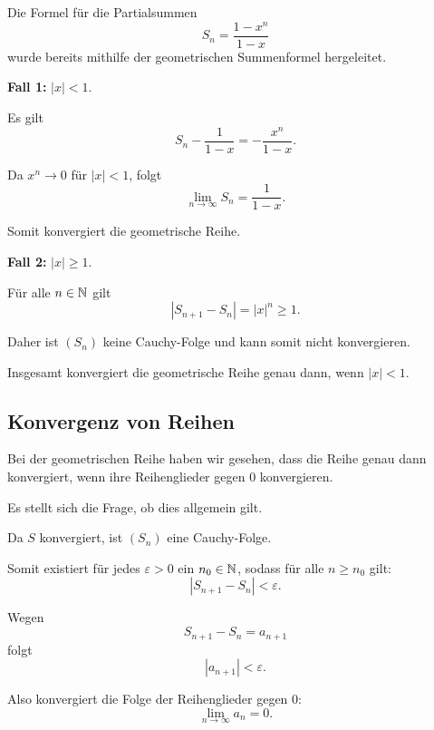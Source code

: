 \begin{myproof}
  Die Formel für die Partialsummen
  \[
    S_n=\frac{1-x^n}{1-x}
  \]
  wurde bereits mithilfe der geometrischen Summenformel
  hergeleitet.

  \textbf{Fall 1:} $|x|<1$.

  Es gilt
  \[
    S_n-\frac{1}{1-x}
    =-\frac{x^n}{1-x}.
  \]

  Da $x^n\to0$ für $|x|<1$, folgt
  \[
    \lim_{n\to\infty}S_n=\frac{1}{1-x}.
  \]

  Somit konvergiert die geometrische Reihe.

  \medskip
  \textbf{Fall 2:} $|x|\ge1$.

  Für alle $n\in\mathbb{N}$ gilt
  \[
    |S_{n+1}-S_n|=|x|^n\ge1.
  \]

  Daher ist $(S_n)$ keine Cauchy-Folge und kann
  somit nicht konvergieren.

  Insgesamt konvergiert die geometrische Reihe
  genau dann, wenn $|x|<1$.
\end{myproof}


\subsection{Konvergenz von Reihen}

Bei der geometrischen Reihe haben wir gesehen, dass
die Reihe genau dann konvergiert, wenn ihre
Reihenglieder gegen $0$ konvergieren.

Es stellt sich die Frage, ob dies allgemein gilt.


\begin{myproof}
  Da $S$ konvergiert, ist $(S_n)$ eine Cauchy-Folge.

  Somit existiert für jedes $\varepsilon>0$
  ein $n_0\in\mathbb{N}$, sodass für alle $n\ge n_0$ gilt:
  \[
    |S_{n+1}-S_n|<\varepsilon.
  \]

  Wegen
  \[
    S_{n+1}-S_n=a_{n+1}
  \]
  folgt
  \[
    |a_{n+1}|<\varepsilon.
  \]

  Also konvergiert die Folge der Reihenglieder
  gegen $0$:
  \[
    \lim_{n\to\infty}a_n=0.
  \]
\end{myproof}

